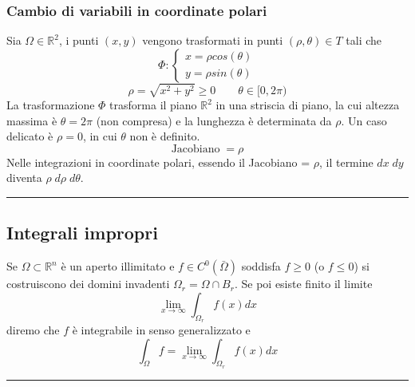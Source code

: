 \subsubsection{Cambio di variabili in coordinate polari}
Sia $\Omega \in \mathbb{R}^2$, i punti $(x,y)$ vengono trasformati in punti $(\rho, \theta) \in T$ tali che
\[
    \Phi : \begin{cases}
        x = \rho cos(\theta)\\
        y =\rho sin(\theta)
    \end{cases}
\]
\[
    \rho = \sqrt{x^2 +y^2} \geq 0 \quad \quad \theta \in[0, 2\pi)
\]
La trasformazione $\Phi$ trasforma il piano $\mathbb{R}^2$ in una striscia di piano, la cui altezza massima è $\theta = 2\pi$ (non compresa) e la lunghezza è determinata da $\rho$.\newline
Un caso delicato è $\rho = 0$, in cui $\theta$ non è definito.\newline
\[
    \text{Jacobiano}\;= \rho
\]
Nelle integrazioni in coordinate polari, essendo il Jacobiano = $\rho$, il termine $dx \; dy$ diventa $\rho \; d \rho \; d \theta$.\newline
\rule{\textwidth}{2pt}
\subsection{Integrali impropri}
Se $\Omega \subset \mathbb{R}^n$ è un aperto illimitato e $f \in C^0(\bar{\Omega})$ soddisfa $f \geq 0$ (o $f\leq 0$) si costruiscono dei domini invadenti $\Omega_r = \Omega \cap B_r$. Se poi esiste finito il limite 
\[
    \lim_{x\rightarrow \infty} \int_{\Omega_r} f(x) dx
\]
diremo che $f$ è integrabile in senso generalizzato e
\[
    \int_\Omega f = \lim_{x\rightarrow \infty} \int_{\Omega_r} f(x) dx
\]
\rule{\textwidth}{2pt}
